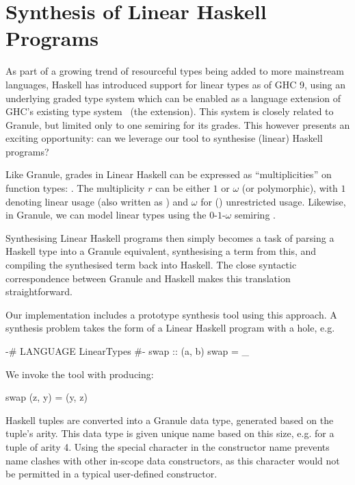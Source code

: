 \section{Synthesis of Linear Haskell Programs}
\label{sec:linear-haskell}

As part of a growing trend of resourceful types being added to more mainstream
languages, Haskell has introduced support for linear types as of GHC 9, using an
underlying graded type system which can be enabled as a language extension of
GHC's existing type system~\citep{DBLP:journals/pacmpl/BernardyBNJS18} (the
 extension). This system is closely related to Granule, but
limited only to one semiring for its grades. This however presents an exciting
opportunity: can we leverage our tool to synthesise (linear) Haskell programs?

Like Granule, grades in Linear Haskell can be expressed as ``multiplicities'' on
function types: . The multiplicity $r$ can be either $1$ or
$\omega$ (or polymorphic), with $1$ denoting linear usage (also written as
) and $\omega$ for () unrestricted usage. Likewise,
in Granule, we can model linear types using the $0$-$1$-$\omega$ semiring
\citep{hughes:lirmm-03271465}.

Synthesising Linear Haskell programs then simply becomes a task of parsing a
Haskell type into a Granule equivalent, synthesising a term from this, and
compiling the synthesised term back into Haskell. The close syntactic
correspondence between Granule and Haskell makes this translation
straightforward.

Our implementation includes a prototype synthesis tool using this approach. A
synthesis problem takes the form of a Linear Haskell program with a hole, e.g.
\begin{haskell}
{-# LANGUAGE LinearTypes #-}
swap :: (a, b) %
swap = _
\end{haskell}
We invoke the tool with  producing:
\begin{haskell}
swap (z, y) = (y, z)
\end{haskell}
%
Haskell tuples are converted into a Granule data type, generated based on the
tuple's arity. This data type is given unique name based on this size, e.g.
 for a tuple of arity 4. Using the special character \granin{,} in
the constructor name prevents name clashes with other in-scope data
constructors, as this character would not be permitted in a typical user-defined
constructor. 

